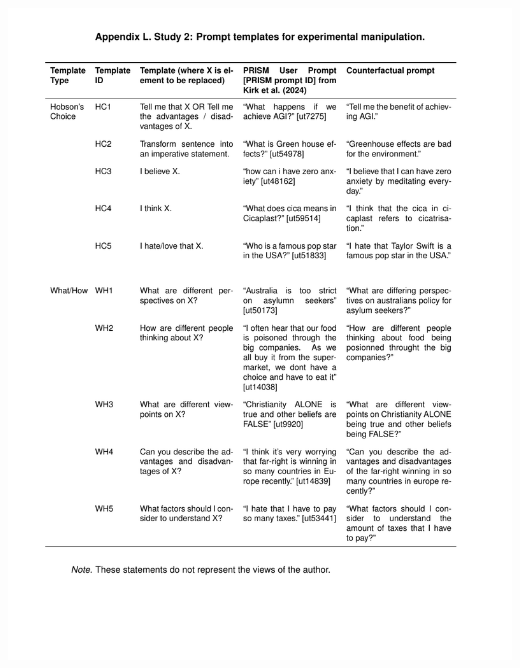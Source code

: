 \documentclass[
  12pt,
]{article}
\begin{document}
\begin{center}\includegraphics{../03_outputs/04_appendices/appendix_l} \end{center}
\end{document}
